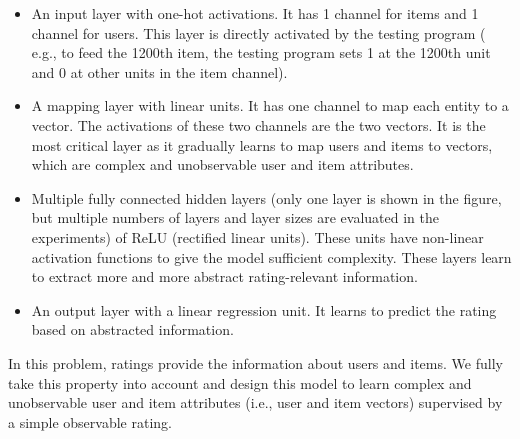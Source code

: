 \documentclass[conference]{IEEEtran}
\begin{document}
\begin{itemize}
	\item An input layer with one-hot activations.
	It has 1 channel for items and 1 channel for users.
	This layer is directly activated by the testing program (
	e.g., to feed the 1200th item, the testing program sets 1 at the 1200th 
	unit and 0 at other units in the item channel).
	\item A mapping layer with linear units. It has one channel to map each 
	entity to a vector.
	The activations of these two channels are the two vectors.
	It is the most critical layer as it gradually learns to map users and 
	items to vectors,
	which are complex and unobservable user and item attributes.
	\item Multiple fully connected hidden layers (only one layer is shown in the
	figure, but	multiple numbers of layers and layer sizes are evaluated in 
	the experiments) of ReLU (rectified linear units).
	These units have non-linear activation functions to give the model 
	sufficient complexity.
	These layers learn to extract more and more abstract rating-relevant 
	information.
	\item An output layer with a linear regression unit.
	It learns to predict the rating based on abstracted information.
\end{itemize}
In this problem, ratings provide the information about users and items.
We fully take this property into account and design this model to learn 
complex and unobservable user and item attributes (i.e., user and item vectors) 
supervised by a simple observable rating.
\end{document}
